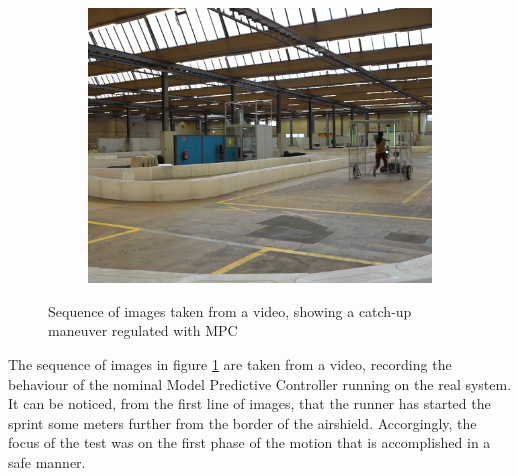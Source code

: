 \documentclass[a4paper,12pt,oneside]{book}
\begin{document}
\begin{figure}
\begin{subfigure}[b]{0.32\textwidth}
        \includegraphics[width=\textwidth]{Catch/Catch9.png}
    \end{subfigure}
    \caption{Sequence of images taken from a video, showing a catch-up maneuver regulated with MPC }
\label{MPC_hard_img1}
\end{figure}

\bigskip
The sequence of images in figure \ref{MPC_hard_img1} are taken from a video, recording the behaviour of the nominal Model Predictive Controller running on the real system.
It can be noticed, from the first line of images, that the runner has started the sprint some meters further from the border of the airshield.
Accorgingly, the focus of the test was on the first phase of the motion that is accomplished in a safe manner.
\end{document}
